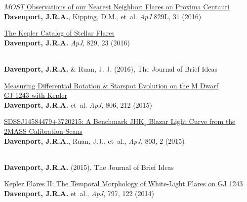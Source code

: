 \begin{etaremune}[leftmargin=10pt]

\item{\sc \href{http://arxiv.org/abs/1608.06672}{\color{NavyBlue} $MOST$ Observations of our Nearest Neighbor: Flares on Proxima Centauri}}\\
{\bf Davenport, J.R.A.}, Kipping, D.M., et~al. {\em ApJ} 829L, 31 (2016)

\item{\sc \href{http://adsabs.harvard.edu/abs/2016ApJ...829...23D}{\color{NavyBlue}The Kepler Catalog of Stellar Flares}}\\
{\bf Davenport, J.R.A.} {\em ApJ}, 829, 23 (2016)

\item\href{http://dx.doi.org/10.5281/zenodo.60308}{\color{NavyBlue}{\sc Searching for ``Tabby's Star'' Analogs in Stripe 82}}\\
{\bf Davenport, J.R.A.} \& Ruan, J. J. (2016), The Journal of Brief Ideas


\item{\sc \href{http://arxiv.org/abs/1505.01524}{\color{NavyBlue} Measuring Differential Rotation \& Starspot Evolution on the M Dwarf \\GJ 1243 with Kepler}}\\
{\bf Davenport, J.R.A.} et~al. {\em ApJ}, 806, 212 (2015)

\item{\sc \href{http://adsabs.harvard.edu/abs/2015ApJ...803....2D}{\color{NavyBlue}SDSSJ14584479+3720215: A Benchmark JHK$_s$ Blazar Light Curve from the\\ 2MASS Calibration Scans}}\\
{\bf Davenport, J.R.A.}, Ruan, J.J., et~al., {\em ApJ}, 803, 2 (2015)

\item\href{http://dx.doi.org/10.5281/zenodo.14841}{\color{NavyBlue}{\sc The Galactic Astigmatism: Constraining the Milky Way Dark Matter Halo\\ Using Ultra-Weak Lensing}}\\
{\bf Davenport, J.R.A.} (2015), The Journal of Brief Ideas


\item{\sc \href{http://adsabs.harvard.edu/abs/2014ApJ...797..122D}{\color{NavyBlue}Kepler Flares II: The Temporal Morphology of White-Light Flares on GJ 1243}}\\
{\bf Davenport, J.R.A.} et~al.,  {\em ApJ}, 797, 122 (2014)


\end{etaremune}
